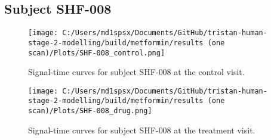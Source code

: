 \documentclass{epflreport}%
\begin{document}
\subsection{Subject SHF{-}008}%
\label{subsec:SubjectSHF{-}008}%

%


\begin{figure}[h!]%
\centering%
\texttt{[image: C:/Users/md1spsx/Documents/GitHub/tristan-human-stage-2-modelling/build/metformin/results (one scan)/Plots/SHF-008\_control.png]}%
\caption{Signal{-}time curves for subject SHF{-}008 at the control visit.}%
\end{figure}

%


\begin{figure}[h!]%
\centering%
\texttt{[image: C:/Users/md1spsx/Documents/GitHub/tristan-human-stage-2-modelling/build/metformin/results (one scan)/Plots/SHF-008\_drug.png]}%
\caption{Signal{-}time curves for subject SHF{-}008 at the treatment visit.}%
\end{figure}
\end{document}
